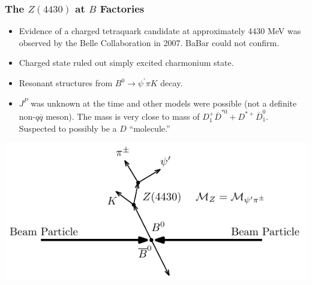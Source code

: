 \documentclass[mathserif,18pt,xcolor=table]{beamer}
\begin{document}
\begin{frame}
  \frametitle{The $Z(4430)$ at $B$ Factories}
  \small{
    \begin{itemize}
    \item Evidence of a charged tetraquark candidate at approximately 4430 MeV was observed by the Belle Collaboration in 2007. BaBar could not confirm.
    \item Charged state ruled out simply excited charmonium state.
    \item Resonant structures from $B^0 \rightarrow \psi^{\prime}\pi K$ decay.
    \item $J^P$ was unknown at the time and other models were possible (not a definite non-$q\overline{q}$ meson). The mass is very close to mass of $D^+_1\overline{D}^{*0} + D^{*+}\overline{D}_1^0$. Suspected to possibly be a $D$ ``molecule.''
    \end{itemize}
    \begin{center}
      \includegraphics[width=.8\linewidth]{../figures/Z4430_diagram.pdf}
    \end{center}
  }
\end{frame}
\end{document}
